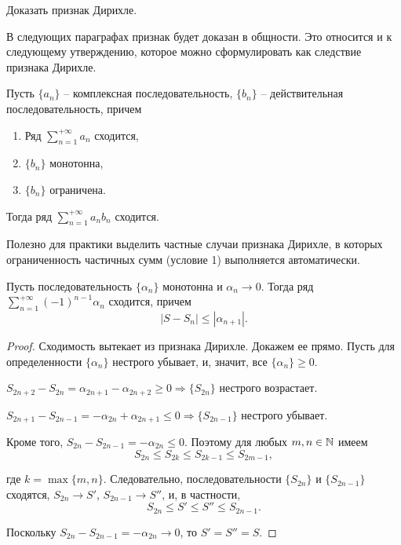 \begin{problem}
    Доказать признак Дирихле.
\end{problem}

В следующих параграфах признак будет доказан в общности. Это относится и к следующему утверждению, которое можно сформулировать как следствие признака Дирихле.

\begin{theorem}
    Пусть $\{a_{n}\}$ -- комплексная последовательность, $\{b_{n}\}$ -- действительная последовательность, причем
    \begin{enumerate}
        \item Ряд $\sum_{n = 1}^{+\infty} a_{n}$ сходится,
        \item $\{b_{n}\}$ монотонна,
        \item $\{b_{n}\}$ ограничена.
    \end{enumerate}
    Тогда ряд $\sum_{n = 1}^{+\infty} a_{n}b_{n}$ сходится.
\end{theorem}

Полезно для практики выделить частные случаи признака Дирихле, в которых ограниченность частичных сумм (условие 1) выполняется автоматически.

\begin{corollary}
    Пусть последовательность $\{\alpha_{n}\}$ монотонна и $\alpha_{n} \to 0$. Тогда ряд $\sum_{n = 1}^{+\infty} (-1)^{n - 1} \alpha_{n}$ сходится, причем
    \[|S - S_{n}| \leq |\alpha_{n + 1}|.\]
\end{corollary}

\begin{proof}
    Сходимость вытекает из признака Дирихле. Докажем ее прямо. Пусть для определенности $\{\alpha_{n}\}$ нестрого убывает, и, значит, все $\{\alpha_{n}\} \geq 0$.
    
    $S_{2n + 2} - S_{2n} = \alpha_{2n + 1} - \alpha_{2n + 2} \geq 0 \Rightarrow \{S_{2n}\}$ нестрого возрастает.
    
    $S_{2n + 1} - S_{2n - 1} = -\alpha_{2n} + \alpha_{2n + 1} \leq 0 \Rightarrow \{S_{2n - 1}\}$ нестрого убывает.
    
    Кроме того, $S_{2n} - S_{2n - 1} = - \alpha_{2n} \leq 0$. Поэтому для любых $m, n \in \mathbb{N}$ имеем
    \[S_{2n} \leq S_{2k} \leq S_{2k - 1} \leq S_{2m - 1},\]
    
    где $k = \max\{m, n\}$. Следовательно, последовательности $\{S_{2n}\}$ и $\{S_{2n - 1}\}$ сходятся, $S_{2n} \to S'$, $S_{2n - 1} \to S''$, и, в частности,
    \[S_{2n} \leq S' \leq S'' \leq S_{2n - 1}.\]
    
    Поскольку $S_{2n} - S_{2n - 1} = -\alpha_{2n} \to 0$, то $S' = S'' = S$.
\end{proof}

